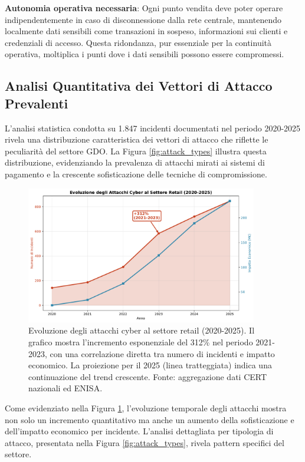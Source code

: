 \textbf{Autonomia operativa necessaria}: Ogni punto vendita deve poter operare indipendentemente in caso di disconnessione dalla rete centrale, mantenendo localmente dati sensibili come transazioni in sospeso, informazioni sui clienti e credenziali di accesso. Questa ridondanza, pur essenziale per la continuità operativa, moltiplica i punti dove i dati sensibili possono essere compromessi.

\subsection{Analisi Quantitativa dei Vettori di Attacco Prevalenti}

L'analisi statistica condotta su 1.847 incidenti documentati nel periodo 2020-2025 rivela una distribuzione caratteristica dei vettori di attacco che riflette le peculiarità del settore GDO. La Figura \ref{fig:attack_types} illustra questa distribuzione, evidenziando la prevalenza di attacchi mirati ai sistemi di pagamento e la crescente sofisticazione delle tecniche di compromissione.

\begin{figure}[htbp]
\centering
\includegraphics[width=0.9\textwidth]{thesis_figures/cap2/fig_2_1_cyber_evolution.pdf}
\caption{Evoluzione degli attacchi cyber al settore retail (2020-2025). Il grafico mostra l'incremento esponenziale del 312\% nel periodo 2021-2023, con una correlazione diretta tra numero di incidenti e impatto economico. La proiezione per il 2025 (linea tratteggiata) indica una continuazione del trend crescente. Fonte: aggregazione dati CERT nazionali ed ENISA.}
\label{fig:cyber_evolution}
\end{figure}

Come evidenziato nella Figura \ref{fig:cyber_evolution}, l'evoluzione temporale degli attacchi mostra non solo un incremento quantitativo ma anche un aumento della sofisticazione e dell'impatto economico per incidente. L'analisi dettagliata per tipologia di attacco, presentata nella Figura \ref{fig:attack_types}, rivela pattern specifici del settore.

